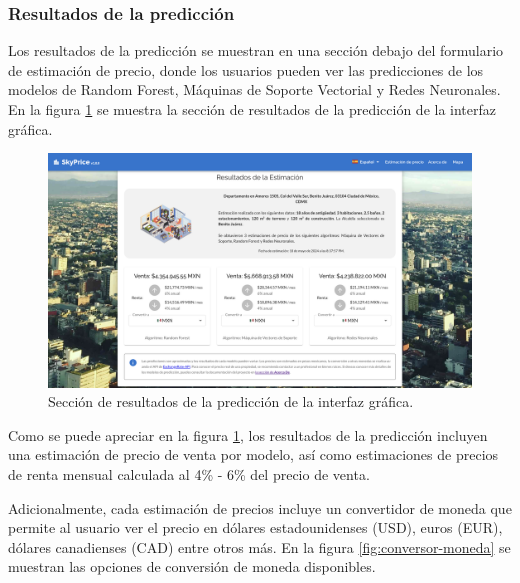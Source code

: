 \subsubsection{Resultados de la predicción}
Los resultados de la predicción se muestran en una sección debajo del formulario
de estimación de precio, donde los usuarios pueden ver las predicciones de los
modelos de Random Forest, Máquinas de Soporte Vectorial y Redes Neuronales. En la
figura \ref{fig:resultados-prediccion} se muestra la sección de resultados de la
predicción de la interfaz gráfica.

\begin{figure}[H]
    \centering
    \includegraphics[width=1.0\textwidth]{imagenes/05-implementacion/interfaz-grafica/resultado-prediccion.png}
    \caption{Sección de resultados de la predicción de la interfaz gráfica.}
    \label{fig:resultados-prediccion}
\end{figure}

Como se puede apreciar en la figura \ref{fig:resultados-prediccion}, los resultados
de la predicción incluyen una estimación de precio de venta por modelo, así como
estimaciones de precios de renta mensual calculada al 4\% - 6\% del precio de venta.

Adicionalmente, cada estimación de precios incluye un convertidor de moneda que
permite al usuario ver el precio en dólares estadounidenses (USD), euros (EUR),
dólares canadienses (CAD) entre otros más. En la figura \ref{fig:conversor-moneda}
se muestran las opciones de conversión de moneda disponibles.

